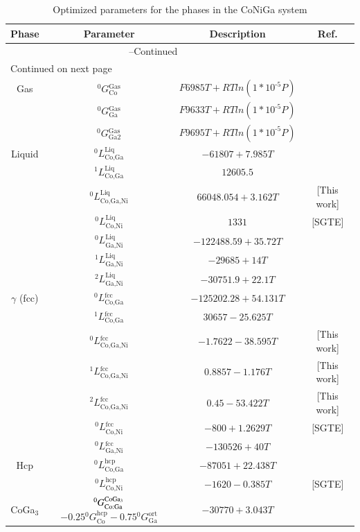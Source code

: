 \documentclass[article]{elsarticle}
\begin{document}
\begin{longtable}{| c | c | c |c|}
\caption{Optimized parameters for the phases in the CoNiGa system}
\label{Opt:Par} \\
\hline 
Phase & Parameter & Description  & Ref.\\ 
\hline
\endfirsthead

\multicolumn{3}{|p{15cm}|}{{\tablename}\thetable{}--Continued}\\[2.0ex]
\hline \hline
\endhead

\hline \multicolumn{3}{l}{{Continued on next page}}\\ \hline
\endfoot

\hline \hline
\endlastfoot

Gas & $^{0}G$$_{\text{Co}}^{\text{Gas}}$ & $F6985T+RTln(1*10^{\text{-5}}P)$ &\cite{Cha10} \tabularnewline
 & $^{0}G$$_{\text{Ga}}^{\text{Gas}}$ & $F9633T+RTln(1*10^{\text{-5}}P)$ &  \cite{Cha10} \tabularnewline
 & $^{0}G$$_{\text{Ga2}}^{\text{Gas}}$ & $F9695T+RTln(1*10^{\text{-5}}P)$ &  \cite{Cha10} \tabularnewline
\hline
Liquid & $^{0}L$$_{\text{Co,Ga}}^{\text{Liq}}$ & $-61807+7.985T$ &  \cite{Cha10} \tabularnewline
 & $^{1}L$$_{\text{Co,Ga}}^{\text{Liq}}$ & $12605.5$ &  \cite{Cha10} \tabularnewline
 & $^{0}L$$_{\text{Co,Ga,Ni}}^{\text{Liq}}$ & $66048.054+3.162T$ &  [This work] \tabularnewline
 & $^{0}L$$_{\text{Co,Ni}}^{\text{Liq}}$ & $1331$ & [SGTE] \tabularnewline
 & $^{0}L$$_{\text{Ga,Ni}}^{\text{Liq}}$ & $-122488.59+35.72T$ & \cite{Ipser04} \tabularnewline
 & $^{1}L$$_{\text{Ga,Ni}}^{\text{Liq}}$ & $-29685+14T$ &  \cite{Ipser04} \tabularnewline
 & $^{2}L$$_{\text{Ga,Ni}}^{\text{Liq}}$ & $-30751.9+22.1T$ & \cite{Ipser04} \tabularnewline
\hline
$\gamma$ (fcc) & $^{0}L$$_{\text{Co,Ga}}^{\text{fcc}}$ & $-125202.28+54.131T$ & \cite{Cha10} \tabularnewline
 & $^{1}L$$_{\text{Co,Ga}}^{\text{fcc}}$ & $30657-25.625T$ & \cite{Cha10} \tabularnewline
 & $^{0}L$$_{\text{Co,Ga,Ni}}^{\text{fcc}}$ & $-1.7622-38.595T$ & [This work] \tabularnewline
 & $^{1}L$$_{\text{Co,Ga,Ni}}^{\text{fcc}}$ & $0.8857-1.176T$ & [This work] \tabularnewline
 & $^{2}L$$_{\text{Co,Ga,Ni}}^{\text{fcc}}$ & $0.45-53.422T$ & [This work] \tabularnewline
 & $^{0}L$$_{\text{Co,Ni}}^{\text{fcc}}$ & $-800+1.2629T$ &  [SGTE] \tabularnewline
 & $^{0}L$$_{\text{Ga,Ni}}^{\text{fcc}}$ & $-130526+40T$ & \cite{Ipser04} \tabularnewline
\hline
Hcp & $^{0}L$$_{\text{Co,Ga}}^{\text{hcp}}$ & $-87051+22.438T$ & \cite{Cha10} \tabularnewline
& $^{0}L$$_{\text{Co,Ni}}^{\text{hcp}}$ & $-1620-0.385T$ & [SGTE] \tabularnewline
\hline
CoGa$_{3}$& $^{0}G_{\text{Co:Ga}}^{\text{CoGa\ensuremath{_{\text{3}}}}}$$-0.25{}^{\text{0}}G_{\text{Co}}^{\text{hcp}}-0.75{}^{\text{0}}G_{\text{Ga}}^{\text{ort}}$ & $-30770+3.043T$ &\cite{Cha10} \tabularnewline

\end{longtable}
\end{document}
